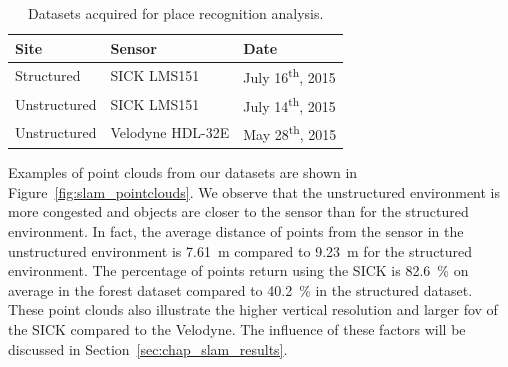 \begin{table}[H]
    \centering
    \begin{tabular}{@{}lll@{}}
        \toprule
        \textbf{Site}  & \textbf{Sensor}   & \textbf{Date}                     \\
        \hline
        Structured     & SICK LMS151       & July 16\textsuperscript{th}, 2015 \\
        Unstructured   & SICK LMS151       & July 14\textsuperscript{th}, 2015 \\
        Unstructured   & Velodyne HDL-32E  & May 28\textsuperscript{th}, 2015  \\
        \bottomrule
    \end{tabular}
    \caption{Datasets acquired for place recognition analysis.}
    \label{tab:slam_datasets}
\end{table}

Examples of point clouds from our datasets are shown in Figure~\ref{fig:slam_pointclouds}. We observe that the unstructured environment is more congested and objects are closer to the sensor than for the structured environment. In fact, the average distance of points from the sensor in the unstructured environment is \SI{7.61}{\meter} compared to \SI{9.23}{\meter} for the structured environment. The percentage of points return using the SICK is \SI{82.6}{\percent} on average in the forest dataset compared to \SI{40.2}{\percent} in the structured dataset. These point clouds also illustrate the higher vertical resolution and larger \gls*{fov} of the SICK compared to the Velodyne. The influence of these factors will be discussed in Section~\ref{sec:chap_slam_results}.

